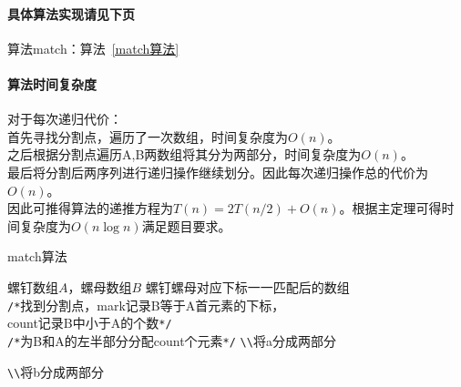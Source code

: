 \documentclass[11pt]{ctexart}
\begin{document}
	\paragraph{具体算法实现请见下页}算法match：算法~\ref{match算法}
	\paragraph{算法时间复杂度}对于每次递归代价：\\
	\hspace*{20pt}首先寻找分割点，遍历了一次数组，时间复杂度为$O(n)$。\\
	\hspace*{20pt}之后根据分割点遍历A,B两数组将其分为两部分，时间复杂度为$O(n)$。\\
	\hspace*{20pt}最后将分割后两序列进行递归操作继续划分。因此每次递归操作总的代价为$O(n)$。\\
	\hspace*{20pt}因此可推得算法的递推方程为$T(n)=2T(n/2)+O(n)$。根据主定理可得时间复杂度为$O(n\log n)$满足题目要求。
	\begin{algorithm}
		\caption{match算法}
		\label{match算法}
		\begin{algorithmic}[1]
			\Require 螺钉数组$A$，螺母数组$B$
			\Ensure 螺钉螺母对应下标一一匹配后的数组
			\\
			\verb|/*|找到分割点，mark记录B等于A首元素的下标，\\
			count记录B中小于A的个数\verb|*/|
			\EndFor\\
			\verb|/*|为B和A的左半部分分配count个元素\verb|*/|
			\verb|\\|将a分成两部分
			\EndWhile
			\EndWhile
			\EndWhile
			
			\verb|\\|将b分成两部分
			\EndWhile
			\EndWhile
			\EndWhile
			\EndFunction
		\end{algorithmic}
	\end{algorithm}
	\newpage
\end{document}
